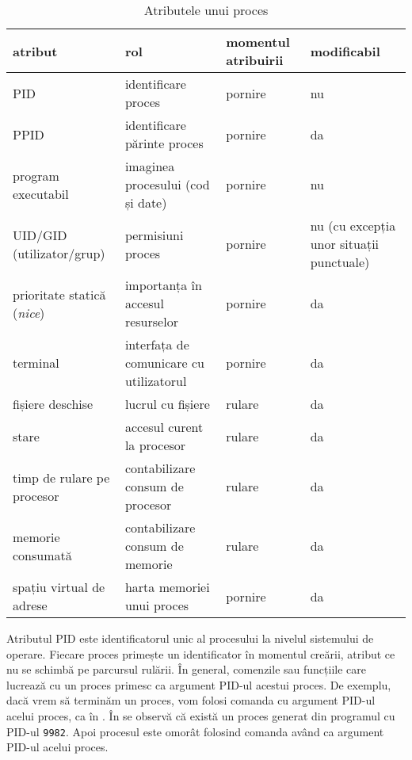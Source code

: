 \begin{table}[!htb]
  \begin{center}
    \begin{tabular}{ p{} p{} p{} p{}  }
      \toprule
        \textbf{atribut} &
        \textbf{rol} &
        \textbf{momentul atribuirii} &
        \textbf{modificabil} \\
      \midrule
        PID &
        identificare proces &
        pornire &
        nu \\
      \midrule
        PPID &
        identificare părinte proces &
        pornire &
        da \\
      \midrule
        program executabil &
        imaginea procesului (cod și date) &
        pornire &
        nu \\
      \midrule
        UID/GID (utilizator/grup) &
        permisiuni proces &
        pornire &
        nu (cu excepția unor situații punctuale) \\
      \midrule
        prioritate statică (\textit{nice}) &
        importanța în accesul resurselor &
        pornire &
        da \\
      \midrule
        terminal &
        interfața de comunicare cu utilizatorul &
        pornire &
        da \\
      \midrule
        fișiere deschise &
        lucrul cu fișiere &
        rulare &
        da \\
      \midrule
        stare &
        accesul curent la procesor &
        rulare &
        da \\
      \midrule
        timp de rulare pe procesor &
        contabilizare consum de procesor &
        rulare &
        da \\
      \midrule
        memorie consumată &
        contabilizare consum de memorie &
        rulare &
        da \\
      \midrule
        spațiu virtual de adrese &
        harta memoriei unui proces &
        pornire &
        da \\
      \bottomrule
    \end{tabular}
  \end{center}
  \caption{Atributele unui proces}
  \label{tab:process:attributes}
\end{table}

Atributul PID este identificatorul unic al procesului la nivelul sistemului de operare.
Fiecare proces primește un identificator în momentul creării, atribut ce nu se schimbă pe parcursul rulării.
În general, comenzile sau funcțiile care lucrează cu un proces primesc ca argument PID-ul acestui proces.
De exemplu, dacă vrem să terminăm un proces, vom folosi comanda  cu argument PID-ul acelui proces, ca în .
În  se observă că există un proces generat din programul  cu PID-ul \texttt{9982}.
Apoi procesul este omorât folosind comanda  având ca argument PID-ul acelui proces.

